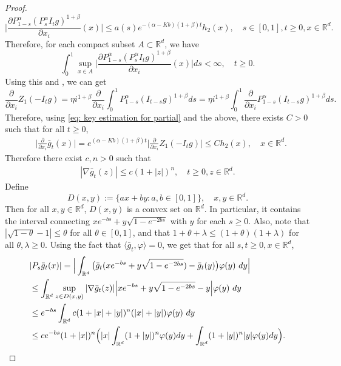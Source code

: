 \documentclass[12pt,a4paper]{amsart}
\theoremstyle{plain}
\theoremstyle{definition}
\numberwithin{equation}{section}
\begin{document}
\begin{proof}
\begin{equation}
  \label{eq: key estimation for partial}
  \Big| \frac{\partial P_{1-s}^\alpha  (P_s^\alpha I_t g)^{1+\beta}}{\partial x_i}  (x)\Big| \leq a(s) e^{-(\alpha - Kb)(1+\beta)t}h_2(x),\quad s\in [0,1],t\geq 0, x\in \mathbb R^d.
\end{equation}
Therefore, for each compact subset $A \subset \mathbb R^d$, we have
\[
  \int_0^1 \sup_{x\in A} \Big|\frac{\partial P_{1-s}^\alpha  (P_s^\alpha I_t g)^{1+\beta}}{\partial x_i}  (x)\Big| ds 
  < \infty
  , \quad t\geq 0.
\]
Using this and \cite[Theorem A.5.2]{Durrett2010Probability}, we can get
\[
  \frac{\partial}{\partial x_i} Z_1(-I_tg)
  = \eta i^{1+\beta}  \frac{\partial}{\partial x_i} \int_0^1 P_{1-s}^\alpha (I_{t-s}g)^{1+\beta} ds
  = \eta i^{1+\beta}  \int_0^1  \frac{\partial}{\partial x_i} P_{1-s}^\alpha (I_{t-s}g)^{1+\beta} ds.
\]
Therefore, using \eqref{eq: key estimation for partial} and the above, there exists  $C> 0$ such that for all $t\geq 0$,
\begin{align}
  & \Big|\frac{\partial}{\partial x_i}\bar{g}_t(x)\Big|
    = e^{(\alpha-Kb)(1+\beta)t}\Big|\frac{\partial}{\partial x_i}Z_1(-I_tg)\Big| \leq C h_2(x),
    \quad x\in \mathbb R^d.
\end{align}
Therefore there exist $c,n>0$ such that
\begin{align}
  \label{ineq: control of sup gt}
  | \nabla \bar g_t (z)|
  \leq c(1+|z|)^n
  , \quad t\geq 0, z\in \mathbb R^d.
\end{align}
Define
\[
  D(x,y)
  := \{ax+by: a,b\in [0,1]\}
  , \quad x, y \in \mathbb R^d.
\]
Then for all $x,y\in \mathbb R^d$, $D(x,y)$ is a convex set on $\mathbb R^d$.
In particular, it contains the interval connecting $xe^{-bs}+y\sqrt{1-e^{-2bs}}$ with $y$ for each $s\geq 0$.
Also, note that $ | \sqrt { 1 - \theta } - 1 | \leq \theta $ for all $ \theta \in [ 0, 1 ] $, and that $ 1 + \theta + \lambda \leq ( 1 + \theta ) ( 1 + \lambda ) $ for all $ \theta, \lambda \geq 0$.
Using the fact that $\langle \bar{g}_t,\varphi\rangle = 0$, we get that for all $s,t\geq 0, x\in \mathbb R^d$,
\begin{align}
  & |P_s\bar{g}_t(x)|
    = \Big|\int_{\mathbb R^d} \big(\bar {g}_t(xe^{-bs}+y\sqrt{1-e^{-2bs}})-\bar {g}_t (y)\big) \varphi(y)~dy \Big| \\
  & \leq \int_{\mathbb R^d} \sup_{z\in D(x,y)} |\nabla \bar g_t (z)|\Big|xe^{-bs}+y\sqrt{1-e^{-2bs}}-y \Big| \varphi(y)~dy \\
  & \leq e^{-bs}\int_{\mathbb R^d} c(1+|x|+|y|)^n (|x|+|y|) \varphi(y)~dy \\
  & \leq ce^{-bs}(1+|x|)^n\Big(|x|\int_{\mathbb R^d} (1+|y|)^n\varphi(y)dy + \int_{\mathbb R^d}(1+|y|)^n|y|\varphi(y)dy\Big).
  \qedhere
\end{align}
\end{proof}
\end{document}
